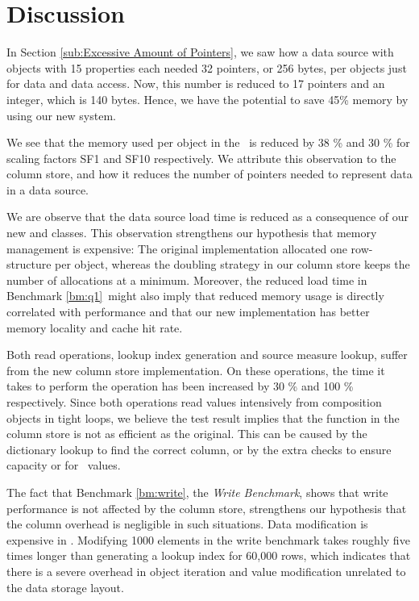 \section{Discussion}
\label{sec:Discussion}
In Section \ref{sub:Excessive Amount of Pointers}, we saw how a data source with objects with 15 properties each needed 32 pointers, or 256 bytes, per objects just for data and data access. Now, this number is reduced to 17 pointers and an integer, which is 140 bytes. Hence, we have the potential to save 45\% memory by using our new system.

We see that the memory used per object in the \tpchdl~is reduced by 38 \% and 30 \% for scaling factors SF1 and SF10 respectively. We attribute this observation to the column store, and how it reduces the number of pointers needed to represent data in a data source. 

We are observe that the data source load time is reduced as a consequence of our new  and  classes. This observation strengthens our hypothesis that memory management is expensive: The original implementation allocated one row-structure per object, whereas the doubling strategy in our column store keeps the number of allocations at a minimum. Moreover, the reduced load time in Benchmark \ref{bm:q1}~might also imply that reduced memory usage is directly correlated with performance and that our new implementation has better memory locality and cache hit rate.

Both read operations, lookup index generation and source measure lookup, suffer from the new column store implementation. On these operations, the time it takes to perform the operation has been increased by 30 \% and 100 \% respectively. Since both operations read values intensively from composition objects in tight loops, we believe the test result implies that the  function in the column store is not as efficient as the original. This can be caused by the dictionary lookup to find the correct column, or by the extra checks to ensure capacity or for \nil~values.

The fact that Benchmark \ref{bm:write}, the \textit{Write Benchmark}, shows that write performance is not affected by the column store, strengthens our hypothesis that the column overhead is negligible in such situations. Data modification is expensive in \gap. Modifying 1000 elements in the write benchmark takes roughly five times longer than generating a lookup index for 60,000 rows, which indicates that there is a severe overhead in object iteration and value modification unrelated to the data storage layout.

